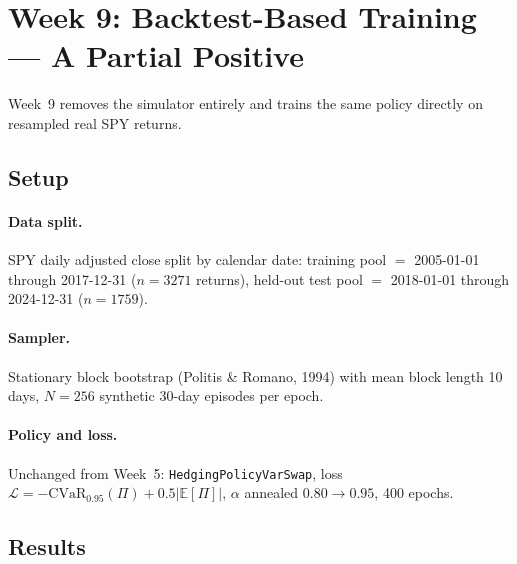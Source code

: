 \documentclass[11pt, a4paper]{article}
\begin{document}
\section{Week 9: Backtest-Based Training --- A Partial Positive}
\label{sec:week9}

Week~9 removes the simulator entirely and trains the same policy directly
on resampled real SPY returns.

\subsection{Setup}

\paragraph{Data split.} SPY daily adjusted close split by calendar date:
training pool $=$ 2005-01-01 through 2017-12-31 ($n = 3271$ returns),
held-out test pool $=$ 2018-01-01 through 2024-12-31 ($n = 1759$).

\paragraph{Sampler.} Stationary block bootstrap (Politis \& Romano, 1994)
with mean block length 10 days, $N=256$ synthetic 30-day episodes per epoch.

\paragraph{Policy and loss.} Unchanged from Week~5:
\texttt{HedgingPolicyVarSwap}, loss
$\mathcal{L} = -\mathrm{CVaR}_{0.95}(\Pi) + 0.5|\mathbb{E}[\Pi]|$,
$\alpha$ annealed $0.80 \to 0.95$, 400 epochs.

\subsection{Results}
\end{document}
